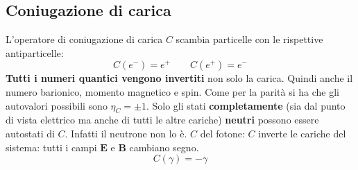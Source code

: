 \subsection{Coniugazione di carica}
L'operatore di coniugazione di carica $C$ scambia particelle con le rispettive antiparticelle: 
\begin{equation*}
    C(e^-)=e^+ \qquad C(e^+)=e^-
\end{equation*}
\textbf{Tutti i numeri quantici vengono invertiti} non solo la carica. Quindi anche il numero barionico, momento magnetico e spin. Come per la parità si ha che gli autovalori possibili sono $\eta_C=\pm1$. Solo gli stati \textbf{completamente} (sia dal punto di vista elettrico ma anche di tutti le altre cariche) \textbf{neutri} possono essere autostati di $C$. Infatti il neutrone non lo è. $C$ del fotone: $C$ inverte le cariche del sistema: tutti i campi $\mathbf{E}$ e $\mathbf{B}$ cambiano segno. 
\begin{equation*}
    C(\gamma)=-\gamma
\end{equation*}
